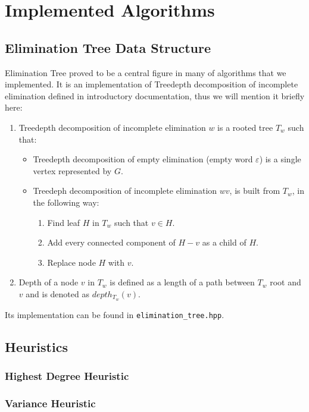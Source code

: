 \section{Implemented Algorithms}
\subsection{Elimination Tree Data Structure}
Elimination Tree proved to be a central figure in many of algorithms that we implemented. It is an implementation of Treedepth decomposition of incomplete elimination defined in introductory documentation, thus we will mention it briefly here:
\begin{enumerate}
	\item Treedepth decomposition of incomplete elimination $w$ is a rooted tree $T_w$ such that:
\begin{itemize}
	\item Treedepth decomposition of empty elimination (empty word $\varepsilon$) is a single vertex represented by $G$.
	\item Treedeph decomposition of incomplete elimination $wv$, is built from $T_w$, in the following way:
	\begin{enumerate}
		\item Find leaf $H$ in $T_w$ such that $v\in H$.
		\item Add every connected component of $H-v$ as a child of $H$.
		\item Replace node $H$ with $v$.
	\end{enumerate}
\end{itemize}
\item Depth of a node $v$ in $T_w$ is defined as a length of a path between $T_w$ root and $v$ and is denoted as $depth_{T_w}\left(v\right)$.
\end{enumerate}
Its implementation can be found in \texttt{elimination\_tree.hpp}.
\subsection{Heuristics}
\subsubsection{Highest Degree Heuristic}
\subsubsection{Variance Heuristic}
